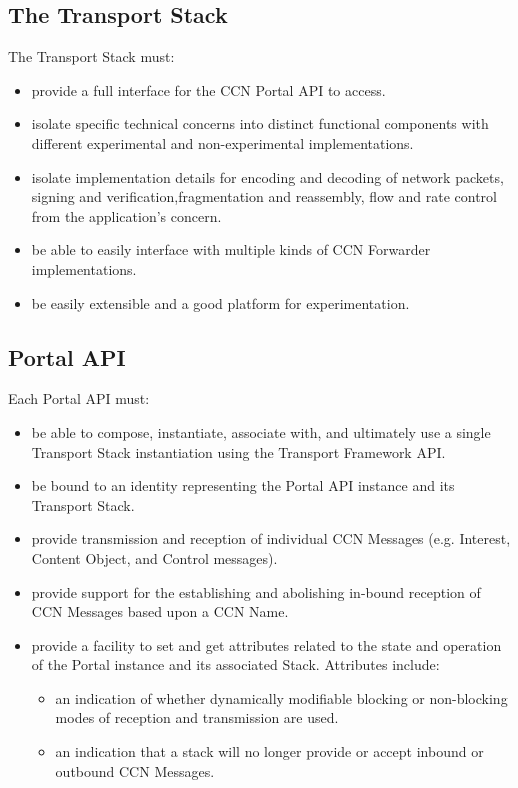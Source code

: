 \subsection {The Transport Stack}
The Transport Stack must:
\begin{itemize}
\item provide a full interface for the CCN Portal API to access.

\item isolate specific technical concerns into distinct functional components with different experimental and non-experimental implementations.

\item isolate implementation details for encoding and decoding of network packets,
signing and verification,fragmentation and reassembly, flow and rate control from the application's concern.

\item be able to easily interface with multiple kinds of CCN Forwarder implementations.

\item be easily extensible and a good platform for experimentation.
\end{itemize}

\subsection {Portal API}
Each Portal API must:

\begin{itemize}
\item be able to compose,
instantiate, associate with, and ultimately use a single
Transport Stack instantiation using the Transport Framework API.

\item be bound to an identity representing the Portal API instance and its Transport Stack.

\item provide transmission and reception of individual CCN Messages (e.g. Interest, Content Object, and Control messages).

\item provide support for the establishing and abolishing in-bound reception of CCN Messages based upon a CCN Name.

\item provide a facility to set and get attributes related to the state and operation of the Portal instance and its associated Stack. Attributes include:
\begin{itemize}
\item an indication of whether dynamically modifiable blocking or non-blocking modes of reception and transmission are used.

\item an indication that a stack will no longer provide or accept inbound or outbound CCN Messages.
\end{itemize}

\end{itemize}
